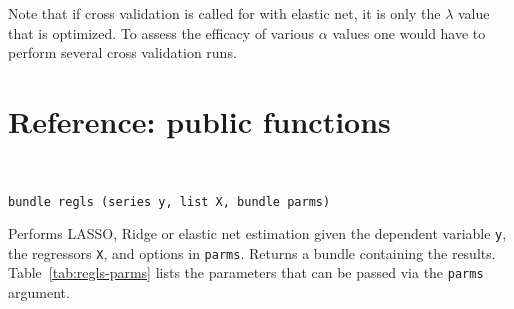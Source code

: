 \documentclass{article}
\newenvironment{funcdoc}
{\noindent\hrulefill\\[-12pt]}
{\medbreak}
\begin{document}
Note that if cross validation is called for with elastic net, it is
only the $\lambda$ value that is optimized. To assess the efficacy of
various $\alpha$ values one would have to perform several cross
validation runs.

\section{Reference: public functions}
\label{sec:funcref}

\begin{funcdoc}
\begin{verbatim}
bundle regls (series y, list X, bundle parms)
\end{verbatim}
  Performs LASSO, Ridge or elastic net estimation given the dependent
  variable \texttt{y}, the regressors \texttt{X}, and options in
  \texttt{parms}. Returns a bundle containing the
  results. Table~\ref{tab:regls-parms} lists the parameters that can
  be passed via the \texttt{parms} argument.
\end{funcdoc}
\end{document}
